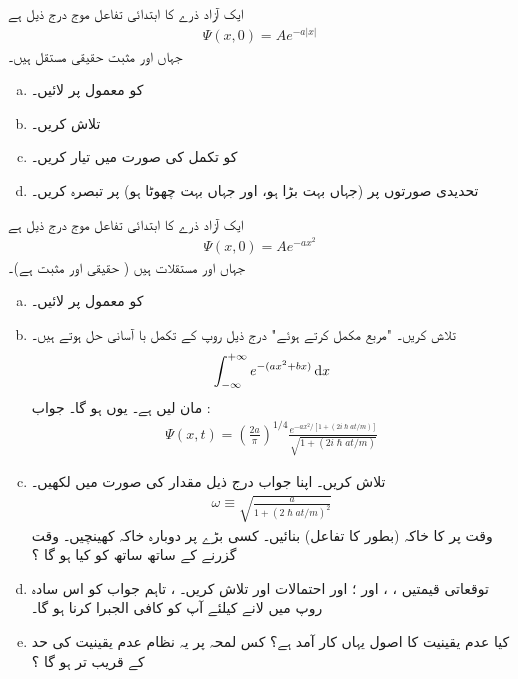 ایک آزاد ذرے کا ابتدائی تفاعل موج درج ذیل ہے 
\begin{align*}
\Psi (x,0) = Ae^{ -a \left| x \right| } 
\end{align*}
جہاں  اور   مثبت حقیقی مستقل ہیں۔
\begin{enumerate}[a.]
\item 
{} کو معمول پر لائیں۔ 
\item
{} تلاش کریں۔ 
\item
{} کو تکمل کی صورت میں تیار کریں۔ 
\item
تحدیدی صورتوں پر (جہاں  بہت بڑا ہو، اور  جہاں   بہت چھوٹا ہو) پر تبصرہ کریں۔ 
\end{enumerate}
 \quad {}
 ایک آزاد ذرے کا ابتدائی تفاعل موج درج ذیل ہے
\begin{align*}
\Psi(x,0) = A e^{-ax^{2}}
\end{align*}
جہاں  اور  مستقلات ہیں ( حقیقی اور مثبت ہے)۔ 
\begin{enumerate}[a.]
\item
{} کو معمول پر لائیں۔ 
\item
{} تلاش کریں۔  "مربع مکمل کرتے ہوئے" درج ذیل روپ کے تکمل با آسانی حل ہوتے ہیں۔ 
\begin{align*}
\int_{-\infty}^{+\infty} e^{-(ax^{2} +bx)} \dif x
\end{align*}
مان لیں  ہے۔ یوں  ہو گا۔ جواب : 
\begin{align*}
\Psi(x,t) = \left( \frac{2a}{\pi} \right) ^{1/4} \frac{e^{-ax^{2}/[1+(2i\hslash at/m)]}}{\sqrt{1+(2i\hslash at/m)}}
\end{align*}
\item
{} تلاش کریں۔ اپنا جواب درج ذیل مقدار کی صورت میں لکھیں۔ 
\begin{align*}
\omega \equiv \sqrt{\frac{a}{1+(2\hslash at/m)^{2}}}
\end{align*}
وقت  پر  کا خاکہ  (بطور  کا تفاعل)  بنائیں۔ کسی بڑے  پر دوبارہ خاکہ کھینچیں۔ وقت  گزرنے کے ساتھ ساتھ   کو کیا ہو گا ؟
\item 
توقعاتی قیمتیں ، ،  اور ؛ اور احتمالات   اور   تلاش کریں۔
  ، تاہم  جواب کو  اس سادہ روپ میں لانے کیلئے آپ کو کافی الجبرا کرنا ہو گا۔ 
\item
کیا عدم یقینیت کا اصول یہاں کار آمد ہے؟ کس لمحہ  پر یہ نظام عدم یقینیت کی حد کے قریب تر ہو گا ؟
\end{enumerate}

